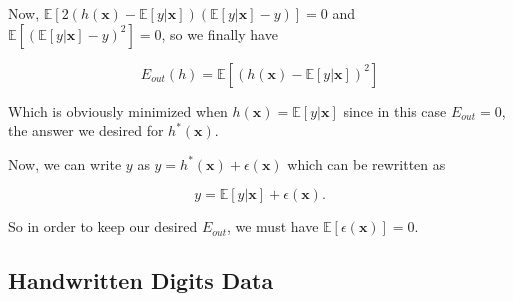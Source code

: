 \documentclass{article}
\renewcommand{\vec}[1]{\mathbf{#1}}
\begin{document}
Now, $\mathbb{E}[2(h(\vec{x}) - \mathbb{E}[y|\vec{x}])(\mathbb{E}[y|\vec{x}] - y)] = 0$ and $\mathbb{E}[(\mathbb{E}[y|\vec{x}] - y)^2] = 0$, so we finally have

$$E_{out}(h) = \mathbb{E}[(h(\vec{x}) - \mathbb{E}[y|\vec{x}])^2]$$

Which is obviously minimized when $h(\vec{x}) = \mathbb{E}[y|\vec{x}]$ since in this case 
$E_{out} = 0$, the answer we
desired for $h^*(\vec{x})$.

Now, we can write $y$ as $y = h^*(\vec{x}) + \epsilon(\vec{x})$ which can be rewritten as

$$y = \mathbb{E}[y|\vec{x}] + \epsilon(\vec{x}).$$

So in order to keep our desired $E_{out}$, we must have $\mathbb{E}[\epsilon(\vec{x})] = 0$.

\subsection*{Handwritten Digits Data}

\textit{}
\end{document}
